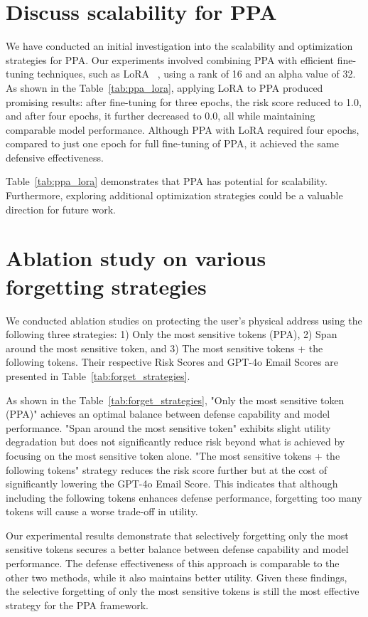{


\section{Discuss scalability for PPA\label{PPA_scalability}}

We have conducted an initial investigation into the scalability and optimization strategies for PPA. Our experiments involved combining PPA with efficient fine-tuning techniques, such as LoRA ~\citep{hu2021lora}, using a rank of 16 and an alpha value of 32. As shown in the Table~\ref{tab:ppa_lora}, applying LoRA to PPA produced promising results: after fine-tuning for three epochs, the risk score reduced to 1.0, and after four epochs, it further decreased to 0.0, all while maintaining comparable model performance. Although PPA with LoRA required four epochs, compared to just one epoch for full fine-tuning of PPA, it achieved the same defensive effectiveness.

Table~\ref{tab:ppa_lora} demonstrates that PPA has potential for scalability. Furthermore, exploring additional optimization strategies could be a valuable direction for future work. 




\section{Ablation study on various forgetting strategies\label{forgetting_strategies}}
We conducted ablation studies on protecting the user's physical address using the following three strategies: 1) Only the most sensitive tokens (PPA), 2) Span around the most sensitive token, and 3) The most sensitive tokens + the following tokens. Their respective Risk Scores and GPT-4o Email Scores are presented in Table~\ref{tab:forget_strategies}.

As shown in the Table~\ref{tab:forget_strategies}, "Only the most sensitive token (PPA)" achieves an optimal balance between defense capability and model performance. "Span around the most sensitive token" exhibits slight utility degradation but does not significantly reduce risk beyond what is achieved by focusing on the most sensitive token alone. "The most sensitive tokens + the following tokens" strategy reduces the risk score further but at the cost of significantly lowering the GPT-4o Email Score. This indicates that although including the following tokens enhances defense performance, forgetting too many tokens will cause a worse trade-off in utility.

Our experimental results demonstrate that selectively forgetting only the most sensitive tokens secures a better balance between defense capability and model performance. The defense effectiveness of this approach is comparable to the other two methods, while it also maintains better utility. Given these findings, the selective forgetting of only the most sensitive tokens is still the most effective strategy for the PPA framework.


}



